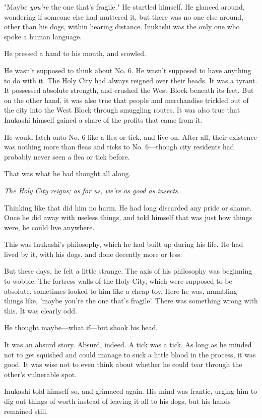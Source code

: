 "Maybe \emph{you're} the one that's fragile." He startled himself. He glanced
around, wondering if someone else had muttered it, but there was no one
else around, other than his dogs, within hearing distance. Inukashi was
the only one who spoke a human language.

He pressed a hand to his mouth, and scowled.

He wasn't supposed to think about No. 6. He wasn't supposed to have
anything to do with it. The Holy City had always reigned over their
heads. It was a tyrant. It possessed absolute strength, and crushed the
West Block beneath its feet. But on the other hand, it was also true
that people and merchandise trickled out of the city into the West Block
through smuggling routes. It was also true that Inukashi himself gained
a share of the profits that came from it.

He would latch onto No. 6 like a flea or tick, and live on. After all,
their existence was nothing more than fleas and ticks to No. 6---though
city residents had probably never seen a flea or tick before.

That was what he had thought all along.

\emph{The Holy City reigns; as for us, we're as good as insects.}

Thinking like that did him no harm. He had long discarded any pride or
shame. Once he did away with useless things, and told himself that was
just how things were, he could live anywhere.

This was Inukashi's philosophy, which he had built up during his life.
He had lived by it, with his dogs, and done decently more or less.

But these days, he felt a little strange. The axis of his philosophy was
beginning to wobble. The fortress walls of the Holy City, which were
supposed to be absolute, sometimes looked to him like a cheap toy. Here
he was, mumbling things like, 'maybe you're the one that's fragile'.
There was something wrong with this. It was clearly odd.

He thought maybe---what if---but shook his head.

It was an absurd story. Absurd, indeed. A tick was a tick. As long as he
minded not to get squished and could manage to suck a little blood in
the process, it was good. It was wise not to even think about whether he
could tear through the other's vulnerable spot.

Inukashi told himself so, and grimaced again. His mind was frantic,
urging him to dig out things of worth instead of leaving it all to his
dogs, but his hands remained still.

